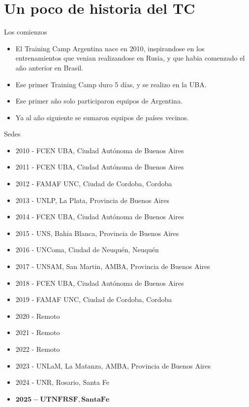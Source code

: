 \documentclass{beamer}
\begin{document}
\section{Un poco de historia del TC}

\begin{frame}{Los comienzos}
    
    \begin{itemize}
        \item El Training Camp Argentina nace en 2010, inspirandose en los entrenamientos que venian realizandose en Rusia, y que habia comenzado el año anterior en Brasil.
        \item Ese primer Training Camp duro 5 días, y se realizo en la UBA.
        \item Ese primer año solo participaron equipos de Argentina.
        \item Ya al año siguiente se sumaron equipos de países vecinos.
    \end{itemize}
\end{frame}

\begin{frame}{Sedes}
    \begin{itemize}
        \item 2010 - FCEN UBA, Ciudad Autónoma de Buenos Aires
        \item 2011 - FCEN UBA, Ciudad Autónoma de Buenos Aires
        \item 2012 - FAMAF UNC, Ciudad de Cordoba, Cordoba
        \item 2013 - UNLP, La Plata, Provincia de Buenos Aires
        \item 2014 - FCEN UBA, Ciudad Autónoma de Buenos Aires
        \item 2015 - UNS, Bahia Blanca, Provincia de Buenos Aires
        \item 2016 - UNComa, Ciudad de Neuquén, Neuquén
        \item 2017 - UNSAM, San Martin, AMBA, Provincia de Buenos Aires
        \item 2018 - FCEN UBA, Ciudad Autónoma de Buenos Aires
        \item 2019 - FAMAF UNC, Ciudad de Cordoba, Cordoba
        \item 2020 - Remoto
        \item 2021 - Remoto
        \item 2022 - Remoto
        \item 2023 - UNLaM, La Matanza, AMBA, Provincia de Buenos Aires
        \item 2024 - UNR, Rosario, Santa Fe
        \item $\bm{2025 - UTN FRSF, Santa Fe}$
    \end{itemize}
\end{frame}
\end{document}
